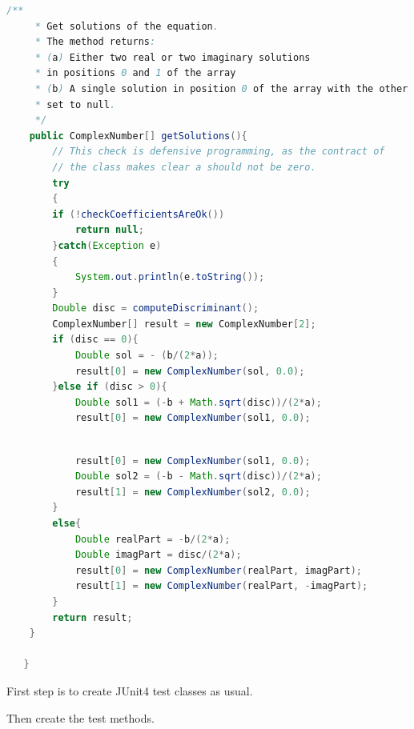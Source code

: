 \documentclass[11pt, xcolor=svgnames]{beamer}
\begin{document}

\begin{frame}[fragile]


\begin{lstlisting}[language=Java,basicstyle=\tiny]
  /**
     * Get solutions of the equation.
     * The method returns:
     * (a) Either two real or two imaginary solutions
     * in positions 0 and 1 of the array
     * (b) A single solution in position 0 of the array with the other
     * set to null.
     */
    public ComplexNumber[] getSolutions(){
        // This check is defensive programming, as the contract of
        // the class makes clear a should not be zero.
    	try
    	{
    	if (!checkCoefficientsAreOk())
            return null;
    	}catch(Exception e)
    	{
    		System.out.println(e.toString());
    	}
        Double disc = computeDiscriminant();
        ComplexNumber[] result = new ComplexNumber[2];
        if (disc == 0){
            Double sol = - (b/(2*a));
            result[0] = new ComplexNumber(sol, 0.0);
        }else if (disc > 0){
            Double sol1 = (-b + Math.sqrt(disc))/(2*a);
            result[0] = new ComplexNumber(sol1, 0.0);

\end{lstlisting}
\end{frame}


\begin{frame}[fragile]

\begin{lstlisting}[language=JAVA,basicstyle=\tiny]

            result[0] = new ComplexNumber(sol1, 0.0);
            Double sol2 = (-b - Math.sqrt(disc))/(2*a);
            result[1] = new ComplexNumber(sol2, 0.0);
        }
        else{
            Double realPart = -b/(2*a);
            Double imagPart = disc/(2*a);
            result[0] = new ComplexNumber(realPart, imagPart);
            result[1] = new ComplexNumber(realPart, -imagPart);
        }
        return result;
    }

   }
\end{lstlisting}
\end{frame}


\begin{frame}

First step is to create JUnit4 test classes as usual.

Then create the test methods.

\end{frame}
\end{document}
